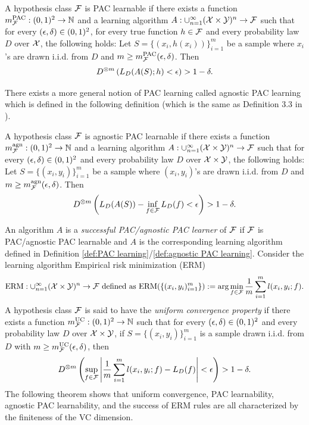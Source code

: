 \begin{defn}\label{def:PAC learning}
A hypothesis class $\mathcal{F}$ is PAC learnable if there exists a function $m_{\mathcal{F}}^{\mathrm{PAC}}: (0,1)^2 \to \mathbb{N}$ and a learning algorithm $A: \cup_{n=1}^\infty (\mathcal{X} \times \mathcal{Y})^n \to \mathcal{F}$ such that for every $(\epsilon, \delta) \in (0,1)^2$, for every true function $h \in \mathcal{F}$ and every probability law $D$ over $\mathcal{X}$, the following holds:
Let $S = \{(x_i, h(x_i))\}_{i=1}^m$ be a sample where $x_i$'s are drawn i.i.d. from  $D$ and $m \geq m_{\mathcal{F}}^{\mathrm{PAC}}(\epsilon,\delta)$. Then
\[
D^{\otimes m}\left( L_{D}(A(S);h)  < \epsilon \right) > 1 - \delta.
\]
\end{defn}
There exists a more general notion of PAC learning called agnostic PAC learning which is defined in the following definition (which is the same as Definition 3.3 in \cite{shalev-shwartz_ben-david_2014}).
\begin{defn}\label{def:agnostic PAC learning}
A hypothesis class $\mathcal{F}$ is agnostic PAC learnable if there exists a function $m_{\mathcal{F}}^{\mathrm{agn}}: (0,1)^2 \to \mathbb{N}$ and a learning algorithm $A: \cup_{n=1}^\infty (\mathcal{X} \times \mathcal{Y})^n \to \mathcal{F}$ such that for every $(\epsilon, \delta) \in (0,1)^2$ and every probability law $D$ over $\mathcal{X} \times \mathcal{Y}$, the following holds: Let $S = \{(x_i, y_i)\}_{i=1}^m$ be a sample where 
$(x_i, y_i)$'s are drawn i.i.d. from  $D$ and 
$m \geq m_{\mathcal{F}}^{\mathrm{agn}}(\epsilon, \delta)$. Then
\[
D^{\otimes m}\left( L_{D}(A(S)) - \inf_{f \in \mathcal{F}} L_{D}(f) < \epsilon \right) > 1 - \delta.
\]
\end{defn}
An algorithm $A$ is a \textit{successful PAC/agnostic PAC learner} of $\mathcal{F}$ if $\mathcal{F}$ is PAC/agnostic PAC learnable and $A$ is the corresponding learning algorithm defined in Definition \ref{def:PAC learning}/\ref{def:agnostic PAC learning}. Consider the learning algorithm Empirical risk minimization (ERM) 
\[\text{ERM}:\cup_{n=1}^\infty(\mathcal{X}\times \mathcal{Y})^n \rightarrow \mathcal{F} \text{ defined as } 
\text{ERM}(\{(x_i, y_i)_{i=1}^m\}) := \arg\min_{f \in \mathcal{F}} \frac{1}{m} \sum_{i=1}^m l(x_i, y_i; f).
\]
A hypothesis class $\mathcal{F}$ is said to have the \textit{uniform convergence property} if there exists a function $m_{\mathcal{F}}^{\mathrm{UC}}: (0,1)^2 \to \mathbb{N}$ such that for every $(\epsilon, \delta) \in (0,1)^2$ and every probability law $D$ over $\mathcal{X} \times \mathcal{Y}$, if $S = \{(x_i, y_i)\}_{i=1}^m$ is a sample drawn i.i.d. from $D$ with $m \geq m_{\mathcal{F}}^{\mathrm{UC}}(\epsilon, \delta)$, then
\[
D^{\otimes m}\left( \sup_{f \in \mathcal{F}} \left| \frac{1}{m} \sum_{i=1}^m l(x_i, y_i; f) - L_D(f) \right| < \epsilon \right) > 1 - \delta.
\]
The following theorem shows that uniform convergence, PAC learnability, agnostic PAC learnability, and the success of ERM rules are all characterized by the finiteness of the VC dimension.

